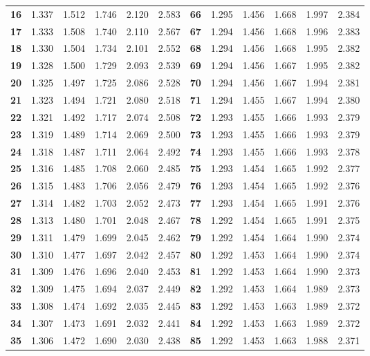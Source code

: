 \documentclass[captions=tableheading, 12pt, headings=small, parskip=half]{scrartcl}
\begin{document}
\begin{table}[ht]
{\begin{tabular}{>{\bfseries}rd{1.3}d{1.3}d{1.3}d{2.3}d{2.3}|>{\bfseries}rd{1.3}d{1.3}d{1.3}d{2.3}d{2.3}}
			16 & 1.337 & 1.512 & 1.746 & 2.120 & 2.583 & 66 & 1.295 & 1.456 & 1.668 & 1.997 & 2.384  \\ 
			17 & 1.333 & 1.508 & 1.740 & 2.110 & 2.567 & 67 & 1.294 & 1.456 & 1.668 & 1.996 & 2.383  \\ 
			18 & 1.330 & 1.504 & 1.734 & 2.101 & 2.552 & 68 & 1.294 & 1.456 & 1.668 & 1.995 & 2.382   \\ 
			19 & 1.328 & 1.500 & 1.729 & 2.093 & 2.539 & 69 & 1.294 & 1.456 & 1.667 & 1.995 & 2.382  \\ 
			20 & 1.325 & 1.497 & 1.725 & 2.086 & 2.528 & 70 & 1.294 & 1.456 & 1.667 & 1.994 & 2.381  \\ 
			21 & 1.323 & 1.494 & 1.721 & 2.080 & 2.518 & 71 & 1.294 & 1.455 & 1.667 & 1.994 & 2.380  \\ 
			22 & 1.321 & 1.492 & 1.717 & 2.074 & 2.508 & 72 & 1.293 & 1.455 & 1.666 & 1.993 & 2.379   \\ 
			23 & 1.319 & 1.489 & 1.714 & 2.069 & 2.500 & 73 & 1.293 & 1.455 & 1.666 & 1.993 & 2.379   \\ 
			24 & 1.318 & 1.487 & 1.711 & 2.064 & 2.492 & 74 & 1.293 & 1.455 & 1.666 & 1.993 & 2.378   \\ 
			25 & 1.316 & 1.485 & 1.708 & 2.060 & 2.485 & 75 & 1.293 & 1.454 & 1.665 & 1.992 & 2.377  \\ 
			26 & 1.315 & 1.483 & 1.706 & 2.056 & 2.479 & 76 & 1.293 & 1.454 & 1.665 & 1.992 & 2.376   \\ 
			27 & 1.314 & 1.482 & 1.703 & 2.052 & 2.473 & 77 & 1.293 & 1.454 & 1.665 & 1.991 & 2.376   \\ 
			28 & 1.313 & 1.480 & 1.701 & 2.048 & 2.467 & 78 & 1.292 & 1.454 & 1.665 & 1.991 & 2.375   \\ 
			29 & 1.311 & 1.479 & 1.699 & 2.045 & 2.462 & 79 & 1.292 & 1.454 & 1.664 & 1.990 & 2.374   \\ 
			30 & 1.310 & 1.477 & 1.697 & 2.042 & 2.457 & 80 & 1.292 & 1.453 & 1.664 & 1.990 & 2.374   \\ 
			31 & 1.309 & 1.476 & 1.696 & 2.040 & 2.453 & 81 & 1.292 & 1.453 & 1.664 & 1.990 & 2.373  \\ 
			32 & 1.309 & 1.475 & 1.694 & 2.037 & 2.449 & 82 & 1.292 & 1.453 & 1.664 & 1.989 & 2.373   \\ 
			33 & 1.308 & 1.474 & 1.692 & 2.035 & 2.445 & 83 & 1.292 & 1.453 & 1.663 & 1.989 & 2.372  \\ 
			34 & 1.307 & 1.473 & 1.691 & 2.032 & 2.441 & 84 & 1.292 & 1.453 & 1.663 & 1.989 & 2.372   \\ 
			35 & 1.306 & 1.472 & 1.690 & 2.030 & 2.438 & 85 & 1.292 & 1.453 & 1.663 & 1.988 & 2.371   \\ 

\end{tabular}}
\end{table}
\end{document}
